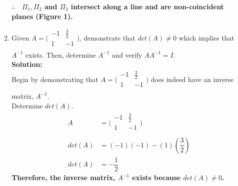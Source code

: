 \documentclass[12pt]{book}
\begin{document}
\begin{enumerate}
\textbf{$\therefore \quad \Pi_1,\Pi_2$ and $\Pi_3$ intersect along a line and are non-coincident planes (Figure 1).}



\newpage

\setcounter{equation}{0}
\item Given $A=\bigg(\begin{smallmatrix} -1 & \frac{3}{2} \\ 1 & -1 \\ \end{smallmatrix}\bigg)$, demonstrate that $det(A) \neq 0$ which implies that $A^{-1}$ exists. Then, determine $A^{-1}$ and verify $AA^{-1} = I$.\\

\textbf{Solution:}\\
Begin by demonstrating that $A=\bigg(\begin{smallmatrix} -1 & \frac{3}{2} \\ 1 & -1 \\ \end{smallmatrix}\bigg)$ does indeed have an inverse matrix, $A^{-1}$.\\ Determine $det(A)$.
\begin{align}
    A &= \bigg(\begin{smallmatrix}
    -1 & \frac{3}{2} \\
    1 & -1 \\
    \end{smallmatrix}\bigg)\\
    det(A) &= (-1)(-1) - (1)\left(\dfrac{3}{2}\right) \\
    det(A) &= -\dfrac{1}{2}
\end{align}
\textbf{Therefore, the inverse matrix, $A^{-1}$ exists because $det(A) \neq 0$.}\\


\end{enumerate}
\end{document}
